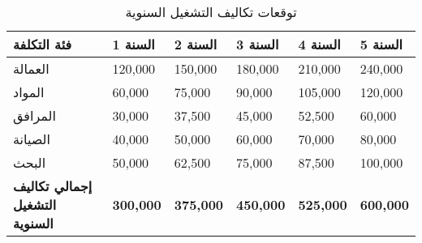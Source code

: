 \begin{table}[h]
\centering
\begin{tabular}{p{}p{}p{}p{}p{}p{}}
\hline
\textbf{فئة التكلفة} & \textbf{السنة 1} & \textbf{السنة 2} & \textbf{السنة 3} & \textbf{السنة 4} & \textbf{السنة 5} \\
\hline
العمالة & 120,000 & 150,000 & 180,000 & 210,000 & 240,000 \\
المواد & 60,000 & 75,000 & 90,000 & 105,000 & 120,000 \\
المرافق & 30,000 & 37,500 & 45,000 & 52,500 & 60,000 \\
الصيانة & 40,000 & 50,000 & 60,000 & 70,000 & 80,000 \\
البحث & 50,000 & 62,500 & 75,000 & 87,500 & 100,000 \\
\hline
\textbf{إجمالي تكاليف التشغيل السنوية} & \textbf{300,000} & \textbf{375,000} & \textbf{450,000} & \textbf{525,000} & \textbf{600,000} \\
\hline
\end{tabular}
\caption{توقعات تكاليف التشغيل السنوية}
\end{table}

